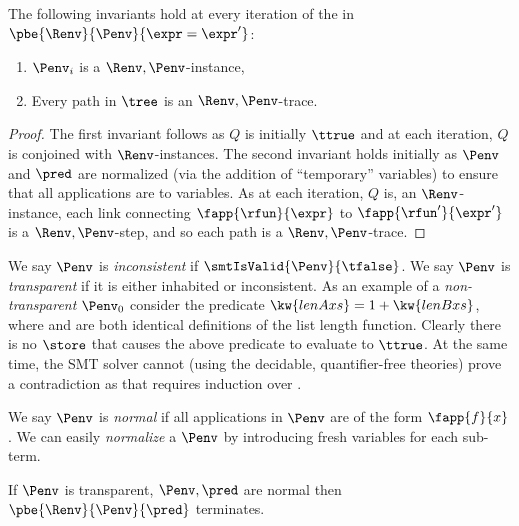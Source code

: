 \begin{lemma} \label{lem:invariants}
The following invariants hold at every
iteration of the  in
$\pbe{\Renv}{\Penv}{\expr = \expr'}$:
%
\begin{enumerate}
\item $\Penv_i$ is a $\Renv, \Penv$-instance,
\item Every path in $\tree$ is an $\Renv,\Penv$-trace.
\end{enumerate}
%
\end{lemma}

\begin{proof}
%
The first invariant follows as $Q$ is
initially $\ttrue$ and at each iteration,
$Q$ is conjoined with $\Renv$-instances.
%
The second invariant holds initially as
$\Penv$ and $\pred$ are normalized (via
the addition of ``temporary'' variables)
to ensure that all applications are to
variables.
%
As at each iteration, $Q$ is, an $\Renv$-instance,
each link connecting $\fapp{\rfun}{\expr}$
to $\fapp{\rfun'}{\expr'}$ is a $\Renv, \Penv$-step,
and so each path is a $\Renv, \Penv$-trace.
\end{proof}


%
We say $\Penv$ is \emph{inconsistent}
if $\smtIsValid{\Penv}{\tfalse}$.
%
We say $\Penv$ is \emph{transparent}
if it is either inhabited or inconsistent.
%
As an example of a \emph{non-transparent}
$\Penv_0$ consider the predicate
$\kw{lenA xs} = 1 + \kw{lenB xs}$,
where  and  are both
identical definitions of the list length
function.
%
Clearly there is no $\store$ that causes
the above predicate to evaluate to $\ttrue$.
%
At the same time, the SMT solver cannot
(using the decidable, quantifier-free theories)
prove a contradiction as that requires
induction over .

%
We say $\Penv$ is \emph{normal}
if all applications in $\Penv$ are
of the form $\fapp{f}{x}$.
%
We can easily \emph{normalize}
a $\Penv$ by introducing fresh
variables for each sub-term.

\begin{theorem} \label{thm:termination}
  If $\Penv$ is transparent, $\Penv, \pred$ are normal
  then $\pbe{\Renv}{\Penv}{\pred}$ terminates.
\end{theorem}

